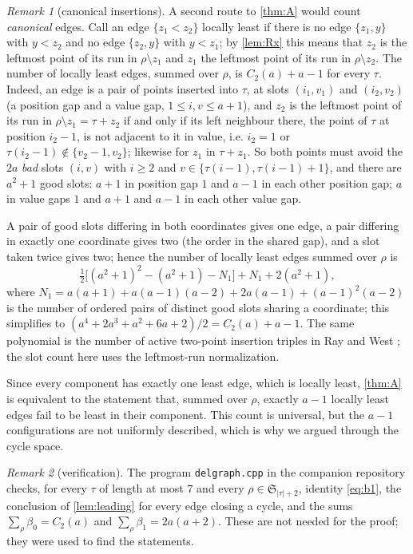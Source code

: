 \documentclass[11pt,reqno]{amsart}
\theoremstyle{plain}
\theoremstyle{definition}
\theoremstyle{remark}
\newtheorem{remark}[remark]{Remark}
\newcommand{\Sym}{\mathfrak{S}}
\newcommand{\bz}{\beta_0}
\newcommand{\bone}{\beta_1}
\begin{document}
\begin{remark}[canonical insertions]\label{rem:canonical}
A second route to \cref{thm:A} would count \emph{canonical} edges. Call an edge $\{z_1<z_2\}$ locally least if there is no edge $\{z_1,y\}$ with $y<z_2$ and no edge $\{z_2,y\}$ with $y<z_1$; by \cref{lem:Rx} this means that $z_2$ is the leftmost point of its run in $\rho\setminus z_1$ and $z_1$ the leftmost point of its run in $\rho\setminus z_2$. The number of locally least edges, summed over $\rho$, is $C_2(a)+a-1$ for every $\tau$. Indeed, an edge is a pair of points inserted into $\tau$, at slots $(i_1,v_1)$ and $(i_2,v_2)$ (a position gap and a value gap, $1\le i,v\le a+1$), and $z_2$ is the leftmost point of its run in $\rho\setminus z_1=\tau+z_2$ if and only if its left neighbour there, the point of $\tau$ at position $i_2-1$, is not adjacent to it in value, i.e. $i_2=1$ or $\tau(i_2-1)\notin\{v_2-1,v_2\}$; likewise for $z_1$ in $\tau+z_1$. So both points must avoid the $2a$ \emph{bad} slots $(i,v)$ with $i\ge2$ and $v\in\{\tau(i-1),\tau(i-1)+1\}$, and there are $a^2+1$ good slots: $a+1$ in position gap $1$ and $a-1$ in each other position gap; $a$ in value gaps $1$ and $a+1$ and $a-1$ in each other value gap. 

A pair of good slots differing in both coordinates gives one edge, a pair differing in exactly one coordinate gives two (the order in the shared gap), and a slot taken twice gives two; hence the number of locally least edges summed over $\rho$ is
\[
\tfrac12\bigl[(a^2+1)^2-(a^2+1)-N_1\bigr]+N_1+2(a^2+1),
\]
where $N_1=a(a+1)+a(a-1)(a-2)+2a(a-1)+(a-1)^2(a-2)$ is the number of ordered pairs of distinct good slots sharing a coordinate; this simplifies to $(a^4+2a^3+a^2+6a+2)/2=C_2(a)+a-1$.
The same polynomial is the number of active two-point insertion triples
in Ray and West \cite[Prop.~5.3, p.~68]{RayWest2003}; the slot count here
uses the leftmost-run normalization. 

Since every component has exactly one least edge, which is locally least, \cref{thm:A} is equivalent to the statement that, summed over $\rho$, exactly $a-1$ locally least edges fail to be least in their component. This count is universal, but the $a-1$ configurations are not uniformly described, which is why we argued through the cycle space.
\end{remark}

\begin{remark}[verification]
The program \texttt{delgraph.cpp} in the companion repository checks, for every $\tau$ of length at most $7$ and every $\rho\in\Sym_{|\tau|+2}$, identity \eqref{eq:b1}, the conclusion of \cref{lem:leading} for every edge closing a cycle, and the sums $\sum_\rho\bz=C_2(a)$ and $\sum_\rho\bone=2a(a+2)$. These are not needed for the proof; they were used to find the statements.
\end{remark}
\end{document}
